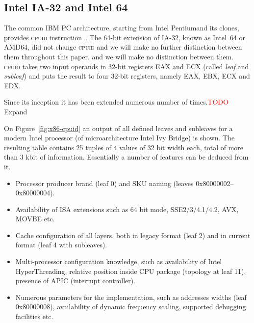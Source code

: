 \documentclass[a4paper,10pt,oneside,unicode]{article}
\newcommand{\cpuid}{\textsc{cpuid} }
\newcommand{\todo}[1][]{\textcolor{red}{TODO #1}}
\begin{document}

\subsection{Intel IA-32 and Intel 64}

The common IBM PC architecture, starting from Intel Pentium\texttrademark and its clones, provides \cpuid instruction~\cite{intelmanual-7vols, amd-sdm-vol1}. The 64-bit extension of IA-32, known as Intel~64 or AMD64, did not change \cpuid and we will make no further distinction between them throughout this paper. and we will make no distinction between them. \cpuid takes two input operands in 32-bit registers EAX and ECX (called \textit{leaf} and \textit{subleaf}) and puts the result to four 32-bit registers, namely EAX, EBX, ECX and EDX.

Since its inception it has been extended numerous number of times.\todo{Expand}

On Figure~\ref{fig:x86-cpuid} an output of all defined leaves and subleaves for a modern Intel processor (of microarchitecture Intel Ivy Bridge) is shown. The resulting table contains 25 tuples of 4 values of 32 bit width each, total of more than 3 kbit of information. Essentially a number of features can be deduced from it.
\begin{itemize}
    \item Processor producer brand (leaf 0) and SKU naming (leaves 0x80000002--0x80000004).
    \item Availability of ISA extensions such as 64 bit mode, SSE2/3/4.1/4.2, AVX, MOVBE etc.
    \item Cache configuration of all layers, both in legacy format (leaf 2) and in current format (leaf 4 with subleaves).
    \item Multi-processor configuration knowledge, such as availability of Intel HyperThreading, relative position inside {CPU} package (topology at leaf 11), presence of {APIC} (interrupt controller).
    \item Numerous parameters for the implementation, such as addresses widths (leaf 0x80000008), availability of dynamic frequency scaling, supported debugging facilities etc.
\end{itemize}
\end{document}
